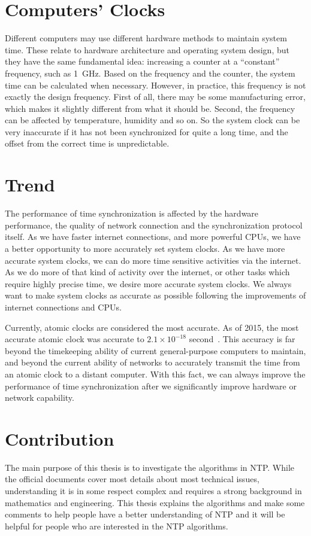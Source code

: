 \section{Computers' Clocks}
\label{sec:computers_clocks}
Different computers may use different hardware methods to maintain system time.
These relate to hardware architecture and operating system design, but they
have the same fundamental idea: increasing a counter at a ``constant''
frequency, such as 1~GHz. Based on the frequency and the counter, the system
time can be calculated when necessary. However, in practice, this frequency is
not exactly the design frequency.  First of all, there may be some
manufacturing error, which makes it slightly different from what it should be.
Second, the frequency can be affected by temperature, humidity and so on. So
the system clock can be very inaccurate if it has not been synchronized for
quite a long time, and the offset from the correct time is unpredictable.

\section{Trend}
\label{sec:trend}
The performance of time synchronization is affected by the hardware
performance, the quality of network connection and the synchronization protocol
itself. 
As we have faster internet connections, and more powerful CPUs, we have a
better opportunity to more accurately set system clocks. As we have more
accurate system clocks, we can do more time sensitive activities via the internet.
As we do more of that kind of activity over the internet, or
other tasks which require highly precise time, we desire more accurate
system clocks.  We always want to make system clocks as accurate as possible
following the improvements of internet connections and CPUs. 

Currently, atomic clocks are considered the most accurate. As of 2015, the most
accurate atomic clock was accurate to $2.1\times 10^{-18}$
second~\cite{atomic_clock}.
This accuracy is far beyond the timekeeping ability of current general-purpose
computers to maintain, and beyond the current ability of networks to accurately
transmit the time from an atomic clock to a distant computer. With this fact,
we can always improve the performance of time synchronization after we
significantly improve hardware or network capability.

\section{Contribution}
\label{sec:contribution}
The main purpose of this thesis is to investigate the algorithms in NTP\null.
While the official documents cover most details about most technical issues,
understanding it is in some respect complex and requires a strong background
in mathematics and engineering. This thesis explains the algorithms
and make some comments to help people have a better understanding of NTP and it
will be helpful for people who are interested in the NTP algorithms.

